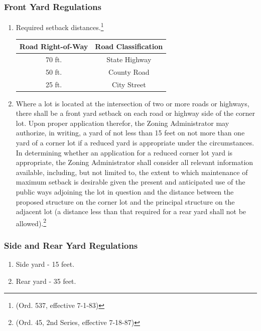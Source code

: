 \subsubsection{Front Yard Regulations}
\begin{enumerate}[{\indent}a)]
    \item Required setback distances.\footnote{(Ord. 537, effective 7-1-83)}        
        \begin{center}
        \begin{tabular}{|c|c|}
            \hline
            \textbf{Road Right-of-Way} & \textbf{Road Classification}\\
            \hline
            70 ft. & State Highway\\
            \hline
            50 ft. & County Road\\
            \hline
            25 ft. & City Street\\
            \hline
        \end{tabular}
        \end{center}
    \item Where a lot is located at the intersection of two or more roads or highways, there shall be a front yard setback on each road or highway side of the corner lot.  Upon proper application therefor, the Zoning Administrator may authorize, in writing, a yard of not less than 15 feet on not more than one yard of a corner lot if a reduced yard is appropriate under the circumstances. In determining whether an application for a reduced corner lot yard is appropriate, the Zoning Administrator shall consider all relevant information available, including, but not limited to, the extent to which maintenance of maximum setback is desirable given the present and anticipated use of the public ways adjoining the lot in question and the distance between the proposed structure on the corner lot and the principal structure on the adjacent lot (a distance less than that required for a rear yard shall not be allowed).\footnote{(Ord. 45, 2nd Series, effective 7-18-87)}
\end{enumerate}
\subsubsection{Side and Rear Yard Regulations}
\begin{enumerate}[{\indent}a)]
    \item Side yard - 15 feet.
    \item Rear yard - 35 feet.
\end{enumerate}
